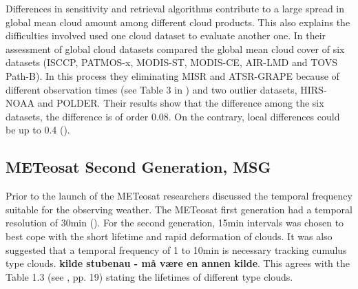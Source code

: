 Differences in sensitivity and retrieval algorithms contribute to a large spread in global mean cloud amount among different cloud products. This also explains the difficulties involved used one cloud dataset to evaluate another one. In their assessment of global cloud datasets \citeauthor{Stubenrauch2013AssessmentPanel} compared the global mean cloud cover of six datasets (ISCCP, PATMOS-x, MODIS-ST, MODIS-CE, AIR-LMD and TOVS Path-B). In this process they eliminating MISR and ATSR-GRAPE because of different observation times (see Table 3 in \cite{Stubenrauch2013AssessmentPanel} ) and two outlier datasets, HIRS-NOAA and POLDER. Their results show that the difference among the six datasets, the difference is of order 0.08. On the contrary, local differences could be up to 0.4 (\cite{Stubenrauch2013AssessmentPanel}). 


\subsection{METeosat Second Generation, MSG} \label{sec:meteosat}
Prior to the launch of the METeosat researchers discussed the temporal frequency suitable for the observing weather. The METeosat first generation had a temporal resolution of 30min (\cite{Stockli2019CloudApplications}). For the second generation, 15min intervals was chosen to best cope with the short lifetime and rapid deformation of clouds. It was also suggested that a temporal frequency of 1 to 10min is necessary tracking cumulus type clouds. \textbf{kilde stubenau - må være en annen kilde}. This agrees with the Table 1.3 (see \cite{lohmann2016}, pp. 19) stating the lifetimes of different type clouds. 

